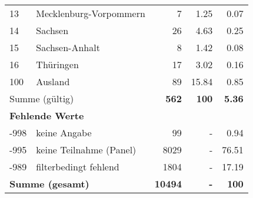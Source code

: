 \begin{longtable}{lXrrr}
     13 &
     \multicolumn{1}{X}{ Mecklenburg-Vorpommern   } &


       \num{7} &
       \num[round-mode=places,round-precision=2]{1,25} &
         \num[round-mode=places,round-precision=2]{0,07} \\

     14 &
     \multicolumn{1}{X}{ Sachsen   } &


       \num{26} &
       \num[round-mode=places,round-precision=2]{4,63} &
         \num[round-mode=places,round-precision=2]{0,25} \\

     15 &
     \multicolumn{1}{X}{ Sachsen-Anhalt   } &


       \num{8} &
       \num[round-mode=places,round-precision=2]{1,42} &
         \num[round-mode=places,round-precision=2]{0,08} \\

     16 &
     \multicolumn{1}{X}{ Thüringen   } &


       \num{17} &
       \num[round-mode=places,round-precision=2]{3,02} &
         \num[round-mode=places,round-precision=2]{0,16} \\

     100 &
     \multicolumn{1}{X}{ Ausland   } &


       \num{89} &
       \num[round-mode=places,round-precision=2]{15,84} &
         \num[round-mode=places,round-precision=2]{0,85} \\
     \midrule
     \multicolumn{2}{l}{Summe (gültig)} &
       \textbf{\num{562}} &
     \textbf{100} &
       \textbf{\num[round-mode=places,round-precision=2]{5,36}} \\
     \multicolumn{5}{l}{\textbf{Fehlende Werte}}\\
       -998 &
       keine Angabe &
         \num{99} &
        - &
         \num[round-mode=places,round-precision=2]{0,94} \\
       -995 &
       keine Teilnahme (Panel) &
         \num{8029} &
        - &
         \num[round-mode=places,round-precision=2]{76,51} \\
       -989 &
       filterbedingt fehlend &
         \num{1804} &
        - &
         \num[round-mode=places,round-precision=2]{17,19} \\
     \midrule
     \multicolumn{2}{l}{\textbf{Summe (gesamt)}} &
          \textbf{\num{10494}} &
        \textbf{-} &
        \textbf{100} \\
     \bottomrule
     \end{longtable}
     
